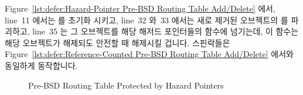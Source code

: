 Figure~\ref{lst:defer:Hazard-Pointer Pre-BSD Routing Table Add/Delete}
에서, line~11 에서는  를 초기화 시키고, line~32 와~33 에서는
새로 제거된 오브젝트의  를 파괴하고, line~35 는 그 오브젝트를
해당 해저드 포인터들의  함수에 넘기는데, 이 함수는 해당
오브젝트가 해제되도 안전할 때 해제시킬 겁니다.
스핀락들은
Figure~\ref{lst:defer:Reference-Counted Pre-BSD Routing Table Add/Delete}
에서와 동일하게 동작합니다.

\begin{figure}[tb]
\centering
{}
\caption{Pre-BSD Routing Table Protected by Hazard Pointers}
\label{fig:defer:Pre-BSD Routing Table Protected by Hazard Pointers}
\end{figure}


